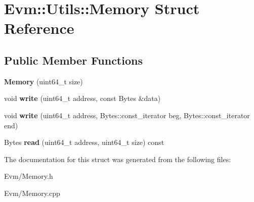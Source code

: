 \hypertarget{struct_evm_1_1_utils_1_1_memory}{}\section{Evm\+:\+:Utils\+:\+:Memory Struct Reference}
\label{struct_evm_1_1_utils_1_1_memory}
\subsection*{Public Member Functions}
\begin{DoxyCompactItemize}
\item 
\mbox{\label{struct_evm_1_1_utils_1_1_memory_ab8d1267eafa00ba1401104a42cbb66bd}} 
{\bfseries Memory} (uint64\+\_\+t size)
\item 
\mbox{\label{struct_evm_1_1_utils_1_1_memory_abf86e5fe3a3bedf2ead48a8d432b5789}} 
void {\bfseries write} (uint64\+\_\+t address, const Bytes \&data)
\item 
\mbox{\label{struct_evm_1_1_utils_1_1_memory_a2a259165924fd686ffa44224568cf245}} 
void {\bfseries write} (uint64\+\_\+t address, Bytes\+::const\+\_\+iterator beg, Bytes\+::const\+\_\+iterator end)
\item 
\mbox{\label{struct_evm_1_1_utils_1_1_memory_a8d00216c4981ac8c5e86726614ce44cb}} 
Bytes {\bfseries read} (uint64\+\_\+t address, uint64\+\_\+t size) const
\end{DoxyCompactItemize}


The documentation for this struct was generated from the following files\+:\begin{DoxyCompactItemize}
\item 
Evm/Memory.\+h\item 
Evm/Memory.\+cpp\end{DoxyCompactItemize}
